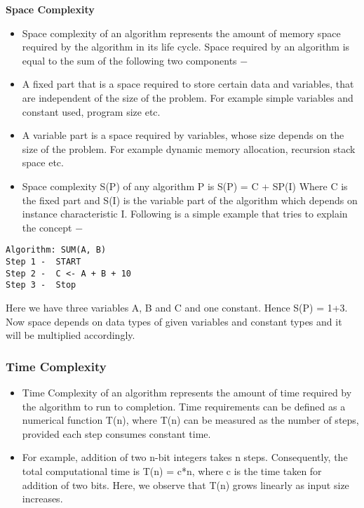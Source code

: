 \documentclass{beamer}
\begin{document}
\begin{frame}
\noindent \textbf{Space Complexity}
\begin{itemize}
\item Space complexity of an algorithm represents the amount of memory space required by the algorithm in its life cycle. Space required by an algorithm is equal to the sum of the following two components −
	
\item A fixed part that is a space required to store certain data and variables, that are independent of the size of the problem. For example simple variables and constant used, program size etc.
\end{itemize}

\end{frame}
\begin{frame}
	\begin{itemize}
\item A variable part is a space required by variables, whose size depends on the size of the problem. For example dynamic memory allocation, recursion stack space etc.

\item Space complexity S(P) of any algorithm P is S(P) = C + SP(I) Where C is the fixed part and S(I) is the variable part of the algorithm which depends on instance characteristic I. Following is a simple example that tries to explain the concept −
\end{itemize}
\end{frame}
\begin{frame}[fragile]
	\begin{verbatim}
Algorithm: SUM(A, B)
Step 1 -  START
Step 2 -  C <- A + B + 10
Step 3 -  Stop
\end{verbatim}
Here we have three variables A, B and C and one constant. 
Hence S(P) = 1+3. Now space depends on data types of given variables and constant types and it will be multiplied accordingly.
\end{frame}
\begin{frame}
\frametitle{Time Complexity}
\begin{itemize}
\item Time Complexity of an algorithm represents the amount of time required by the algorithm to run to completion. Time requirements can be defined as a numerical function T(n), where T(n) can be measured as the number of steps, provided each step consumes constant time.

\item For example, addition of two n-bit integers takes n steps. Consequently, the total computational time is T(n) = c*n, where c is the time taken for addition of two bits. Here, we observe that T(n) grows linearly as input size increases.
\end{itemize}
\end{frame}
\end{document}
